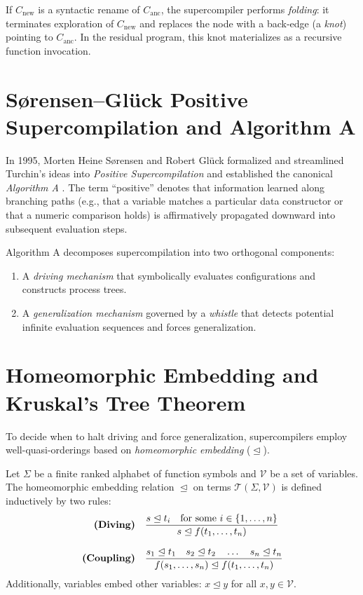 If $C_{\text{new}}$ is a syntactic rename of $C_{\text{anc}}$, the supercompiler performs \emph{folding}: it terminates exploration of $C_{\text{new}}$ and replaces the node with a back-edge (a \emph{knot}) pointing to $C_{\text{anc}}$. In the residual program, this knot materializes as a recursive function invocation.

\section{S\o{}rensen--Gl\"uck Positive Supercompilation and Algorithm A}
\label{sec:background:sorensen}

In 1995, Morten Heine S\o{}rensen and Robert Gl\"uck formalized and streamlined Turchin's ideas into \emph{Positive Supercompilation} and established the canonical \emph{Algorithm A} \citep{sorensen1995algorithm}. The term ``positive'' denotes that information learned along branching paths (e.g., that a variable matches a particular data constructor or that a numeric comparison holds) is affirmatively propagated downward into subsequent evaluation steps.

Algorithm A decomposes supercompilation into two orthogonal components:
\begin{enumerate}
    \item A \emph{driving mechanism} that symbolically evaluates configurations and constructs process trees.
    \item A \emph{generalization mechanism} governed by a \emph{whistle} that detects potential infinite evaluation sequences and forces generalization.
\end{enumerate}

\section{Homeomorphic Embedding and Kruskal's Tree Theorem}
\label{sec:background:kruskal}

To decide when to halt driving and force generalization, supercompilers employ well-quasi-orderings based on \emph{homeomorphic embedding} ($\trianglelefteq$).

\begin{definition}
Let $\Sigma$ be a finite ranked alphabet of function symbols and $\mathcal{V}$ be a set of variables. The homeomorphic embedding relation $\trianglelefteq$ on terms $\mathcal{T}(\Sigma, \mathcal{V})$ is defined inductively by two rules:
\begin{align}
\text{\bf (Diving)} \quad & \frac{s \trianglelefteq t_i \quad \text{for some } i \in \{1, \dots, n\}}{s \trianglelefteq f(t_1, \dots, t_n)} \\[0.8em]
\text{\bf (Coupling)} \quad & \frac{s_1 \trianglelefteq t_1 \quad s_2 \trianglelefteq t_2 \quad \dots \quad s_n \trianglelefteq t_n}{f(s_1, \dots, s_n) \trianglelefteq f(t_1, \dots, t_n)}
\end{align}
Additionally, variables embed other variables: $x \trianglelefteq y$ for all $x, y \in \mathcal{V}$.
\end{definition}

